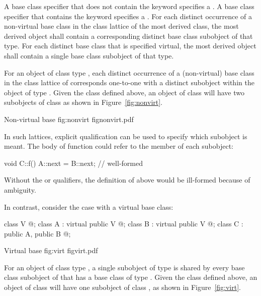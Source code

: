 \pnum
{}%
A base class specifier that does not contain the keyword
 specifies a . A base
class specifier that contains the keyword  specifies a
. For each distinct occurrence of a
non-virtual base class in the class lattice of the most derived class,
the most derived object shall contain a
corresponding distinct base class subobject of that type. For each
distinct base class that is specified virtual, the most derived object
shall contain a single base class subobject of that type.

\pnum
\begin{note}
For an object of class type , each distinct occurrence of a
(non-virtual) base class  in the class lattice of 
corresponds one-to-one with a distinct  subobject within the
object of type . Given the class  defined above, an
object of class  will have two subobjects of class  as
shown in Figure~\ref{fig:nonvirt}.

\begin{importgraphic}
{Non-virtual base}
{fig:nonvirt}
{fignonvirt.pdf}
\end{importgraphic}

In such lattices, explicit qualification can be used to specify which
subobject is meant. The body of function  could refer to the
member  of each  subobject:
\begin{codeblock}
void C::f() { A::next = B::next; }      // well-formed
\end{codeblock}
Without the  or  qualifiers, the definition of
 above would be ill-formed because of
ambiguity.
\end{note}

\pnum
\begin{note}
In contrast, consider the case with a virtual base class:
\begin{codeblock}
class V { @\commentellip@ };
class A : virtual public V { @\commentellip@ };
class B : virtual public V { @\commentellip@ };
class C : public A, public B { @\commentellip@ };
\end{codeblock}
\begin{importgraphic}
{Virtual base}
{fig:virt}
{figvirt.pdf}
\end{importgraphic}
For an object  of class type , a single subobject of
type  is shared by every base class subobject of  that has a
 base class of type . Given the class 
defined above, an object of class  will have one subobject of
class , as shown in Figure~\ref{fig:virt}.
%
%
\end{note}

